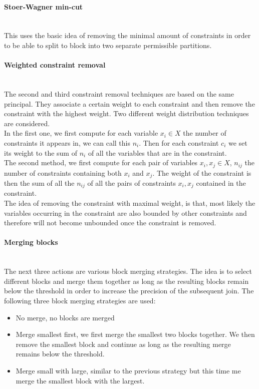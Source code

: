 \paragraph{Stoer-Wagner min-cut}\mbox{}\\
This uses the basic idea of removing the minimal amount of constraints in order to be able to split to block into two separate permissible partitions.
\paragraph{Weighted constraint removal}\mbox{}\\
The second and third constraint removal techniques are based on the same principal. They associate a certain weight to each constraint  and then remove the constraint with the highest weight. Two different weight distribution techniques are considered. \\
In the first one, we first compute for each variable $x_i \in X$ the number of constraints it appears in, we can call this $n_i$. Then for each constraint $c_i$ we set its weight to the sum of $n_i$ of all the variables that are in the constraint.\\
The second method, we first compute for each pair of variables $x_i,x_j\in X$, $n_{ij}$ the number of constraints containing both $x_i$ and $x_j$. The weight of the constraint is then the sum of all the $n_{ij}$ of all the pairs of constraints $x_i,x_j$ contained in the constraint.\\
The idea of removing the constraint with maximal weight, is that, most likely the variables occurring in the constraint are also bounded by other constraints and therefore will not become unbounded once the constraint is removed.
\paragraph{Merging blocks}\mbox{}\\
The next three actions are various block merging strategies. The idea is to select different blocks and merge them together as long as the resulting blocks remain below the threshold in order to increase the precision of the subsequent join. The following three block merging strategies are used:
\begin{itemize}
	\item No merge, no blocks are merged
	\item Merge smallest first, we first merge the smallest two blocks together. We then remove the smallest block and continue as long as the resulting merge remains below the threshold.
	\item Merge small with large, similar to the previous strategy but this time me merge the smallest block with the largest.
\end{itemize}

